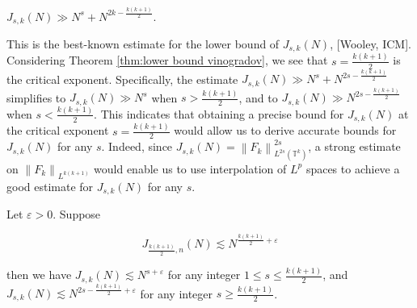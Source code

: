 \begin{thm}\label{thm:lower bound vinogradov}
    $J_{s, k}(N) \gg N^{s}+N^{2 k-\frac{k(k+1)}{2}}$.
\end{thm}
This is the best-known estimate for the lower bound of \(J_{s, k}(N)\), [Wooley, ICM]. Considering Theorem \ref{thm:lower bound vinogradov}, we see that \(s=\frac{k(k+1)}{2}\) is the critical exponent. Specifically, the estimate \(J_{s, k}(N) \gg N^{s} + N^{2s - \frac{k(k+1)}{2}}\) simplifies to \(J_{s, k}(N) \gg N^{s}\) when \(s > \frac{k(k+1)}{2}\), and to \(J_{s, k}(N) \gg N^{2s - \frac{k(k+1)}{2}}\) when \(s < \frac{k(k+1)}{2}\). This indicates that obtaining a precise bound for \(J_{s, k}(N)\) at the critical exponent \(s=\frac{k(k+1)}{2}\) would allow us to derive accurate bounds for \(J_{s, k}(N)\) for any \(s\). Indeed, since \(J_{s, k}(N)=\left\|F_{k}\right\|_{L^{2s}\left(\mathbb{T}^{k}\right)}^{2s}\), a strong estimate on \(\left\|F_{k}\right\|_{L^{k(k+1)}}\) would enable us to use interpolation of \(L^{p}\) spaces to achieve a good estimate for \(J_{s, k}(N)\) for any \(s\).


\begin{thm}\label{thm:vinagradov interpolation}
 Let $\varepsilon>0$. Suppose

$$
J_{\frac{k(k+1)}{2}, n}(N) \lesssim N^{\frac{k(k+1)}{2}+\varepsilon}
$$

then we have $J_{s, k}(N) \lesssim N^{s+\varepsilon}$ for any integer $1 \leq s \leq \frac{k(k+1)}{2}$, and $J_{s, k}(N) \lesssim N^{2 s-\frac{k(k+1)}{2}+\varepsilon}$ for any integer $s \geq \frac{k(k+1)}{2}$.
    
\end{thm}


